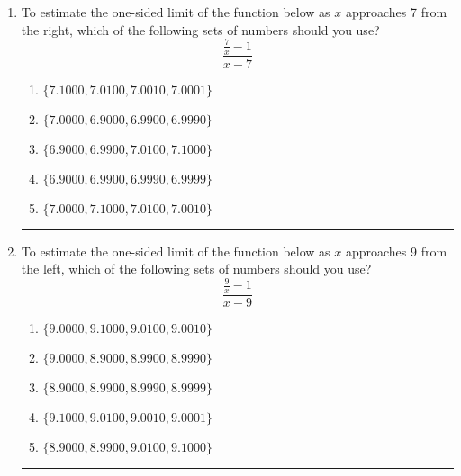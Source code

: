 \documentclass[14pt]{extbook}
\newcommand{\litem}[1]{\item#1\hspace*{-1cm}\rule{\textwidth}{0.4pt}}
\begin{document}
\begin{enumerate}
{\begin{enumerate}[label=\Alph*.]
\end{enumerate} }
\litem{
To estimate the one-sided limit of the function below as $x$ approaches 7 from the right, which of the following sets of numbers should you use?\[ \frac{\frac{7}{x} - 1}{x - 7} \]\begin{enumerate}[label=\Alph*.]
\item \( \{ 7.1000, 7.0100, 7.0010, 7.0001 \} \)
\item \( \{ 7.0000, 6.9000, 6.9900, 6.9990 \} \)
\item \( \{ 6.9000, 6.9900, 7.0100, 7.1000 \} \)
\item \( \{ 6.9000, 6.9900, 6.9990, 6.9999 \} \)
\item \( \{ 7.0000, 7.1000, 7.0100, 7.0010 \} \)

\end{enumerate} }
\litem{
To estimate the one-sided limit of the function below as $x$ approaches 9 from the left, which of the following sets of numbers should you use?\[ \frac{\frac{9}{x} - 1}{x - 9} \]\begin{enumerate}[label=\Alph*.]
\item \( \{ 9.0000, 9.1000, 9.0100, 9.0010 \} \)
\item \( \{ 9.0000, 8.9000, 8.9900, 8.9990 \} \)
\item \( \{ 8.9000, 8.9900, 8.9990, 8.9999 \} \)
\item \( \{ 9.1000, 9.0100, 9.0010, 9.0001 \} \)
\item \( \{ 8.9000, 8.9900, 9.0100, 9.1000 \} \)

\end{enumerate} }
\end{enumerate}
\end{document}
